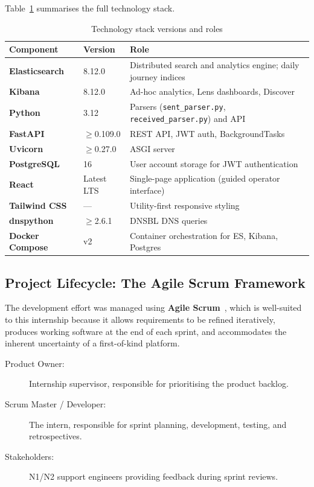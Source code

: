 \documentclass[12pt,a4paper,oneside]{report}
\newcommand{\rowA}{\rowcolor{rowgray}}
\begin{document}
Table~\ref{tab:techstack} summarises the full technology stack.

\begin{table}[H]
\centering
\caption{Technology stack versions and roles}
\label{tab:techstack}
\begin{tabularx}{\textwidth}{@{}>{\bfseries}p{3.2cm} p{2.8cm} X@{}}
\toprule
Component & Version & Role \\
\midrule
\rowA Elasticsearch & 8.12.0 & Distributed search and analytics engine; daily journey indices \\
Kibana & 8.12.0 & Ad-hoc analytics, Lens dashboards, Discover \\
\rowA Python & 3.12 & Parsers (\texttt{sent\_parser.py}, \texttt{received\_parser.py}) and API \\
FastAPI & $\geq$0.109.0 & REST API, JWT auth, BackgroundTasks \\
\rowA Uvicorn & $\geq$0.27.0 & ASGI server \\
PostgreSQL & 16 & User account storage for JWT authentication \\
\rowA React & Latest LTS & Single-page application (guided operator interface) \\
Tailwind CSS & — & Utility-first responsive styling \\
\rowA dnspython & $\geq$2.6.1 & DNSBL DNS queries \\
Docker Compose & v2 & Container orchestration for ES, Kibana, Postgres \\
\bottomrule
\end{tabularx}
\end{table}

\subsection{Project Lifecycle: The Agile Scrum Framework}

The development effort was managed using \textbf{Agile Scrum}~\cite{scrumGuide}, which is well-suited to this internship because it allows requirements to be refined iteratively, produces working software at the end of each sprint, and accommodates the inherent uncertainty of a first-of-kind platform.

\begin{description}
  \item[Product Owner:] Internship supervisor, responsible for prioritising the product backlog.
  \item[Scrum Master / Developer:] The intern, responsible for sprint planning, development, testing, and retrospectives.
  \item[Stakeholders:] N1/N2 support engineers providing feedback during sprint reviews.
\end{description}
\end{document}
